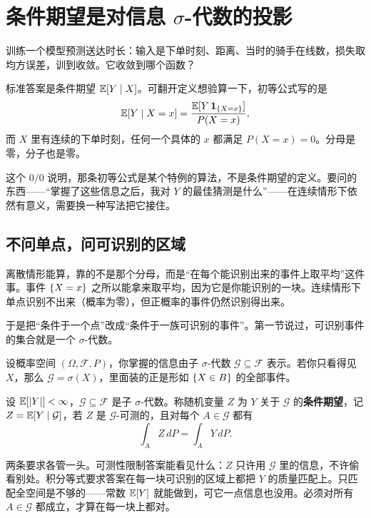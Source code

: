 \section{\texorpdfstring{条件期望是对信息 \(\sigma\)-代数的投影}{条件期望是对信息 sigma-代数的投影}}
\label{sec:12-Real-Analysis-Support/05-Measure-Integration-and-Conditional-Expectation/05}

训练一个模型预测送达时长：输入是下单时刻、距离、当时的骑手在线数，损失取均方误差，训到收敛。它收敛到哪个函数？

标准答案是条件期望 \(\mathbb{E}[Y\mid X]\)。可翻开定义想验算一下，初等公式写的是
\[
\mathbb{E}[Y\mid X=x]=\frac{\mathbb{E}[Y\,\mathbf{1}_{\left\{X=x\right\}}]}{P(X=x)},
\]
而 \(X\) 里有连续的下单时刻，任何一个具体的 \(x\) 都满足 \(P(X=x)=0\)。分母是零，分子也是零。

这个 \(0/0\) 说明，那条初等公式是某个特例的算法，不是条件期望的定义。要问的东西——``掌握了这些信息之后，我对 \(Y\) 的最佳猜测是什么''——在连续情形下依然有意义，需要换一种写法把它接住。

\subsection{不问单点，问可识别的区域}

离散情形能算，靠的不是那个分母，而是``在每个能识别出来的事件上取平均''这件事。事件 \(\left\{X=x\right\}\) 之所以能拿来取平均，因为它是你能识别的一块。连续情形下单点识别不出来（概率为零），但正概率的事件仍然识别得出来。

于是把``条件于一个点''改成``条件于一族可识别的事件''。第一节说过，可识别事件的集合就是一个 \(\sigma\)-代数。

设概率空间 \((\Omega,\mathcal F,P)\)，你掌握的信息由子 \(\sigma\)-代数 \(\mathcal G\subseteq\mathcal F\) 表示。若你只看得见 \(X\)，那么 \(\mathcal G=\sigma(X)\)，里面装的正是形如 \(\left\{X\in B\right\}\) 的全部事件。

\begin{definition}
设 \(\mathbb{E}[\left|Y\right|]<\infty\)，\(\mathcal G\subseteq\mathcal F\) 是子 \(\sigma\)-代数。称随机变量 \(Z\) 为 \(Y\) 关于 \(\mathcal G\) 的\textbf{条件期望}，记 \(Z=\mathbb{E}[Y\mid\mathcal G]\)，若 \(Z\) 是 \(\mathcal G\)-可测的，且对每个 \(A\in\mathcal G\) 都有
\[
\int_A Z\,dP=\int_A Y\,dP.
\]
\end{definition}

两条要求各管一头。可测性限制答案能看见什么：\(Z\) 只许用 \(\mathcal G\) 里的信息，不许偷看别处。积分等式要求答案在每一块可识别的区域上都把 \(Y\) 的质量匹配上。只匹配全空间是不够的——常数 \(\mathbb{E}[Y]\) 就能做到，可它一点信息也没用。必须对所有 \(A\in\mathcal G\) 都成立，才算在每一块上都对。

